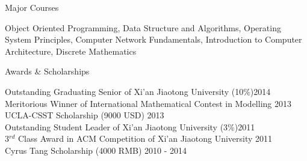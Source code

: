 \documentclass{resume} %
\begin{document}
\begin{rSection}{Major Courses}

Object Oriented Programming, Data Structure and Algorithms, Operating System Principles, Computer Network Fundamentals, Introduction to Computer Architecture, Discrete Mathematics

\end{rSection}


\begin{rSection}{Awards \& Scholarships}

Outstanding Graduating Senior of Xi'an Jiaotong University (10\%)\hfill 2014 \\
Meritorious Winner of International Mathematical Contest in Modelling \hfill 2013 \\
UCLA-CSST Scholarship (9000 USD) \hfill 2013 \\
Outstanding Student Leader of Xi'an Jiaotong University (3\%)\hfill 2011 \\
3$^{rd}$ Class Award in ACM Competition of Xi'an Jiaotong University \hfill 2011 \\
Cyrus Tang Scholarship (4000 RMB) \hfill 2010 - 2014 \\

\end{rSection}
\end{document}
